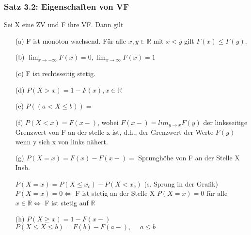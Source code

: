 \documentclass[a4paper,11pt]{article}
\begin{document}
\subsubsection{Satz 3.2: Eigenschaften von VF} 
Sei X eine ZV und F ihre VF. Dann gilt
\begin{itemize}
    \item[(a)] F ist monoton wachsend.
    \newline Für alle $x,y\in\mathbb{R}$ mit $x<y$ gilt $F(x)\leq F(y)$.
    \item[(b)] $\lim_{x\rightarrow-\infty}F(x)=0, \lim_{x\rightarrow\infty}F(x)=1$
    \item[(c)] F ist rechtsseitig stetig.
    \item[(d)] $P(X>x)=1-F(x), x\in\mathbb{R}$
    \item[(e)] $P((a<X\leq b))= $
    \item[(f)] $P(X<x)=F(x-)$, wobei $F(x-)=lim_{y\rightarrow x}F(y)$ der linksseitige Grenzwert von F an der stelle x ist, d.h., der Grenzwert der Werte $F(y)$ wenn y sich x von links nähert.
    \item[(g)] $P(X=x)=F(x)-F(x-) =$ Sprunghöhe von F an der Stelle X
    \newline Insb.
    \newline
    \newline $P(X=x)=P(X\leq x_c)-P(X<x_c)$ (s. Sprung in der Grafik)
    \newline $P(X=x)=0 \Leftrightarrow$ F ist stetig an der Stelle X
    \newline $P(X=x)=0$ für alle $x\in\mathbb{R} \Leftrightarrow$ F ist stetig auf $\mathbb{R}$
    \item[(h)] $P(X\geq x)=1-F(x-)$
    \newline $ P(X\leq X \leq b) = F(b)-F(a-), \hspace{15pt} a\leq b$
\end{itemize}
\end{document}
